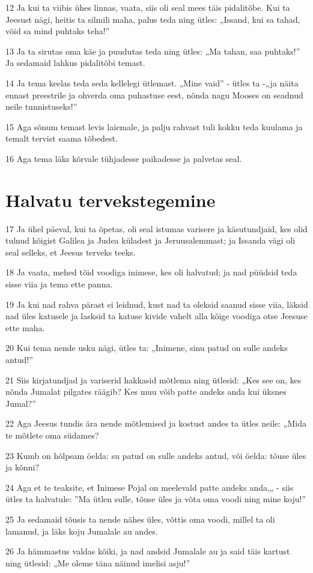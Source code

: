 \par 12 Ja kui ta viibis ühes linnas, vaata, siis oli seal mees täis pidalitõbe. Kui ta Jeesust nägi, heitis ta silmili maha, palus teda ning ütles: „Issand, kui sa tahad, võid sa mind puhtaks teha!”
\par 13 Ja ta sirutas oma käe ja puudutas teda ning ütles: „Ma tahan, saa puhtaks!” Ja sedamaid lahkus pidalitõbi temast.
\par 14 Ja tema keelas teda seda kellelegi ütlemast. „Mine vaid” - ütles ta -„ja näita ennast preestrile ja ohverda oma puhastuse eest, nõnda nagu Mooses on seadnud neile tunnistuseks!”
\par 15 Aga sõnum temast levis laiemale, ja palju rahvast tuli kokku teda kuulama ja temalt tervist saama tõbedest.
\par 16 Aga tema läks kõrvale tühjadesse paikadesse ja palvetas seal.

\section*{Halvatu tervekstegemine}

\par 17 Ja ühel päeval, kui ta õpetas, oli seal istumas varisere ja käsutundjaid, kes olid tulnud kõigist Galilea ja Judea küladest ja Jeruusalemmast; ja Issanda vägi oli seal selleks, et Jeesus terveks teeks.
\par 18 Ja vaata, mehed tõid voodiga inimese, kes oli halvatud; ja nad püüdsid teda sisse viia ja tema ette panna.
\par 19 Ja kui nad rahva pärast ei leidnud, kust nad ta oleksid saanud sisse viia, läksid nad üles katusele ja lasksid ta katuse kivide vahelt alla kõige voodiga otse Jeesuse ette maha.
\par 20 Kui tema nende usku nägi, ütles ta: „Inimene, sinu patud on sulle andeks antud!”
\par 21 Siis kirjatundjad ja variserid hakkasid mõtlema ning ütlesid: „Kes see on, kes nõnda Jumalat pilgates räägib? Kes muu võib patte andeks anda kui üksnes Jumal?”
\par 22 Aga Jeesus tundis ära nende mõtlemised ja kostust andes ta ütles neile: „Mida te mõtlete oma südames?
\par 23 Kumb on hõlpsam öelda: su patud on sulle andeks antud, või öelda: tõuse üles ja kõnni?
\par 24 Aga et te teaksite, et Inimese Pojal on meelevald patte andeks anda,„ - siis ütles ta halvatule: ”Ma ütlen sulle, tõuse üles ja võta oma voodi ning mine koju!”
\par 25 Ja sedamaid tõusis ta nende nähes üles, võttis oma voodi, millel ta oli lamanud, ja läks koju Jumalale au andes.
\par 26 Ja hämmastus valdas kõiki, ja nad andsid Jumalale au ja said täis kartust ning ütlesid: „Me oleme täna näinud imelisi asju!”

